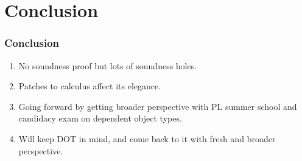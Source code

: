 \documentclass{beamer}
\begin{document}
\section{Conclusion}
\begin{frame}
\frametitle{Conclusion}
\begin{enumerate}
\item No soundness proof but lots of soundness holes.
\item Patches to calculus affect its elegance.
\item Going forward by getting broader perspective with PL summer
  school and candidacy exam on dependent object types.
\item Will keep DOT in mind, and come back to it with fresh and broader perspective.
\end{enumerate}
\end{frame}
\end{document}
